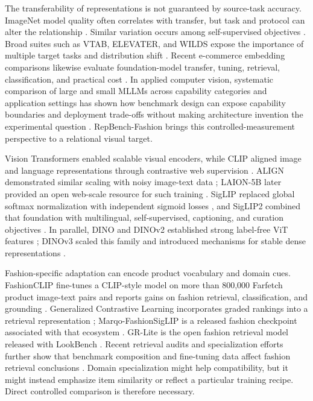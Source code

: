 \documentclass[preprint,12pt]{elsarticle}
\begin{document}
The transferability of representations is not guaranteed by source-task accuracy. ImageNet model quality often correlates with transfer, but task and protocol can alter the relationship \cite{kornblith2019transfer}. Similar variation occurs among self-supervised objectives \cite{ericsson2021transfer}. Broad suites such as VTAB, ELEVATER, and WILDS expose the importance of multiple target tasks and distribution shift \cite{zhai2019vtab,li2022elevater,koh2021wilds}. Recent e-commerce embedding comparisons likewise evaluate foundation-model transfer, tuning, retrieval, classification, and practical cost \cite{czerwinska2025ecommerce}. In applied computer vision, systematic comparison of large and small MLLMs across capability categories and application settings has shown how benchmark design can expose capability boundaries and deployment trade-offs without making architecture invention the experimental question \cite{feng2025mllmbenchmark}. RepBench-Fashion brings this controlled-measurement perspective to a relational visual target.

Vision Transformers \cite{dosovitskiy2021vit} enabled scalable visual encoders, while CLIP aligned image and language representations through contrastive web supervision \cite{radford2021clip}. ALIGN demonstrated similar scaling with noisy image-text data \cite{jia2021align}; LAION-5B later provided an open web-scale resource for such training \cite{schuhmann2022laion}. SigLIP replaced global softmax normalization with independent sigmoid losses \cite{zhai2023siglip}, and SigLIP2 combined that foundation with multilingual, self-supervised, captioning, and curation objectives \cite{tschannen2025siglip2}. In parallel, DINO and DINOv2 established strong label-free ViT features \cite{caron2021dino,oquab2024dinov2}; DINOv3 scaled this family and introduced mechanisms for stable dense representations \cite{simeoni2025dinov3}.

Fashion-specific adaptation can encode product vocabulary and domain cues. FashionCLIP fine-tunes a CLIP-style model on more than 800,000 Farfetch product image-text pairs and reports gains on fashion retrieval, classification, and grounding \cite{chia2022fashionclip}. Generalized Contrastive Learning incorporates graded rankings into a retrieval representation \cite{zhu2025gcl}; Marqo-FashionSigLIP is a released fashion checkpoint associated with that ecosystem \cite{marqo2024fashionsiglip}. GR-Lite is the open fashion retrieval model released with LookBench \cite{gao2026lookbench}. Recent retrieval audits and specialization efforts further show that benchmark composition and fine-tuning data affect fashion retrieval conclusions \cite{czerwinska2025ecommerce,xue2026zooclaw}. Domain specialization might help compatibility, but it might instead emphasize item similarity or reflect a particular training recipe. Direct controlled comparison is therefore necessary.
\end{document}
